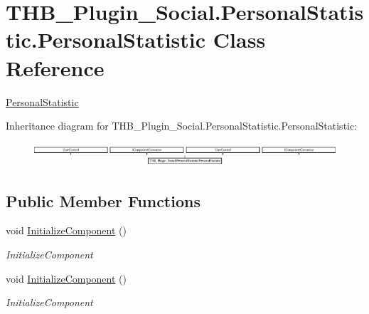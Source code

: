 \hypertarget{class_t_h_b___plugin___social_1_1_personal_statistic_1_1_personal_statistic}{}\section{T\+H\+B\+\_\+\+Plugin\+\_\+\+Social.\+Personal\+Statistic.\+Personal\+Statistic Class Reference}
\label{class_t_h_b___plugin___social_1_1_personal_statistic_1_1_personal_statistic}


\mbox{\hyperlink{class_t_h_b___plugin___social_1_1_personal_statistic_1_1_personal_statistic}{Personal\+Statistic}}  


Inheritance diagram for T\+H\+B\+\_\+\+Plugin\+\_\+\+Social.\+Personal\+Statistic.\+Personal\+Statistic\+:\begin{figure}[H]
\begin{center}
\leavevmode
\includegraphics[height=0.869565cm]{d7/d60/class_t_h_b___plugin___social_1_1_personal_statistic_1_1_personal_statistic}
\end{center}
\end{figure}
\subsection*{Public Member Functions}
\begin{DoxyCompactItemize}
\item 
void \mbox{\hyperlink{class_t_h_b___plugin___social_1_1_personal_statistic_1_1_personal_statistic_accd1054e342a7f08b35fea1e39378bf3}{Initialize\+Component}} ()
\begin{DoxyCompactList}\small\item\em Initialize\+Component \end{DoxyCompactList}\item 
void \mbox{\hyperlink{class_t_h_b___plugin___social_1_1_personal_statistic_1_1_personal_statistic_accd1054e342a7f08b35fea1e39378bf3}{Initialize\+Component}} ()
\begin{DoxyCompactList}\small\item\em Initialize\+Component \end{DoxyCompactList}\end{DoxyCompactItemize}
